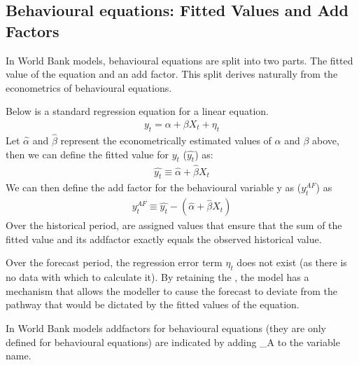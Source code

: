\documentclass[letterpaper,10pt,english]{jupyterBook}
\begin{document}
\subsection{Behavioural equations: Fitted Values and Add Factors}
\label{\detokenize{content/05_SimpleModel/SimpleModel:behavioural-equations-fitted-values-and-add-factors}}
\sphinxAtStartPar
In World Bank models, behavioural equations are split into two parts. The fitted value of the equation and an add factor. This split derives naturally from the econometrics of behavioural equations.

\sphinxAtStartPar
Below is a standard regression equation for a linear equation.
\begin{equation*}
\begin{split}y_t = \alpha + \beta X_t +\eta_t\end{split}
\end{equation*}
\sphinxAtStartPar
Let \(\hat{\alpha}\) and \(\hat{\beta}\) represent the econometrically estimated values of \(\alpha\) and \(\beta\) above, then we can define the fitted value for \(y_t\) (\(\hat{y_t}\)) as:
\begin{equation*}
\begin{split} \hat{y_t} \equiv  \hat{\alpha} + \hat{\beta} X_t  \end{split}
\end{equation*}
\sphinxAtStartPar
We can then define the add factor for the behavioural variable y as (\(y^{AF}_t\))  as
\begin{equation*}
\begin{split} y^{AF}_t \equiv  \hat{y_t} -( \hat{\alpha} + \hat{\beta} X_t)  \end{split}
\end{equation*}
\sphinxAtStartPar
Over the historical period,  are assigned values that ensure that the sum of the  fitted value and its add\sphinxhyphen{}factor exactly equals the observed historical value. 

\sphinxAtStartPar
Over the forecast period, the regression error term \(\eta_t\) does not exist (as there is no data with which to calculate it). By retaining the , the model has a mechanism that allows the modeller to cause the forecast to deviate from the pathway that would be dictated by the fitted values of the equation.

\sphinxAtStartPar
In World Bank models add\sphinxhyphen{}factors for behavioural equations (they are only defined for behavioural equations) are indicated by adding \_A to the variable name.
\end{document}
